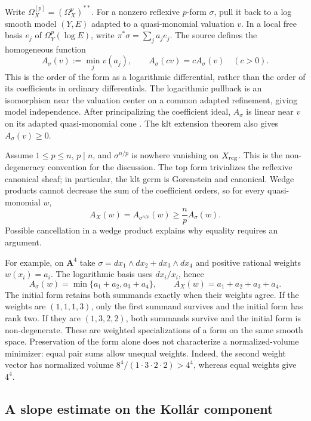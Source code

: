 Write $\Omega_X^{[p]}=(\Omega_X^p)^{**}$. For a nonzero reflexive
$p$-form $\sigma$, pull it back to a log smooth model $(Y,E)$ adapted
to a quasi-monomial valuation $v$. In a local free basis $e_j$ of
$\Omega_Y^p(\log E)$, write $\pi^*\sigma=\sum_j a_j e_j$. The source
defines the homogeneous function
\[
\tag{68.23bj}\label{eq:ytd-local-form-order}
 A_\sigma(v):=\min_j v(a_j),
 \qquad A_\sigma(c v)=cA_\sigma(v)\quad(c>0).
\]
This is the order of the form as a logarithmic differential, rather
than the order of its coefficients in ordinary differentials.
The logarithmic pullback is an isomorphism near the valuation center
on a common adapted refinement, giving model independence.
After principalizing the coefficient ideal, $A_\sigma$ is linear
near $v$ on its adapted quasi-monomial cone
\cite[Lemmas~3.7 and~3.9]{XuZhuang26StableFormsV2}.
The klt extension theorem
\cite[Theorem~1.4]{GKKP11FormsV4} also gives $A_\sigma(v)\geq0$.

Assume $1\leq p\leq n$, $p\mid n$, and $\sigma^{n/p}$ is nowhere
vanishing on $X_{\rm reg}$. This is the non-degeneracy convention
for the discussion. The top form trivializes the reflexive canonical
sheaf; in particular, the klt germ is Gorenstein and canonical.
Wedge products cannot decrease the sum of the coefficient orders,
so for every quasi-monomial $w$,
\[
\tag{68.23bk}\label{eq:ytd-local-form-wedge}
 A_X(w)=A_{\sigma^{n/p}}(w)
       \geq\frac np A_\sigma(w).
\]
Possible cancellation in a wedge product explains why equality
requires an argument.

For example, on $\mathbf A^4$ take
$\sigma=dx_1\wedge dx_2+dx_3\wedge dx_4$ and positive rational
weights $w(x_i)=a_i$. The logarithmic basis uses $dx_i/x_i$,
hence
\[
\tag{68.23bl}\label{eq:ytd-local-form-weighted-example}
 A_\sigma(w)=\min\{a_1+a_2,a_3+a_4\},
 \qquad A_X(w)=a_1+a_2+a_3+a_4.
\]
The initial form retains both summands exactly when their weights
agree. If the weights are $(1,1,1,3)$, only the first summand survives
and the initial form has rank two. If they are $(1,3,2,2)$, both
summands survive and the initial form is non-degenerate.
These are weighted specializations of a form on the same smooth
space. Preservation of the form alone does not characterize a
normalized-volume minimizer: equal pair sums allow unequal weights.
Indeed, the second weight vector has normalized volume
$8^4/(1\cdot3\cdot2\cdot2)>4^4$, whereas equal weights give $4^4$.

\subsection{A slope estimate on the Koll\'ar component}
\label{sec:ytd-local-klt-form-slope}

